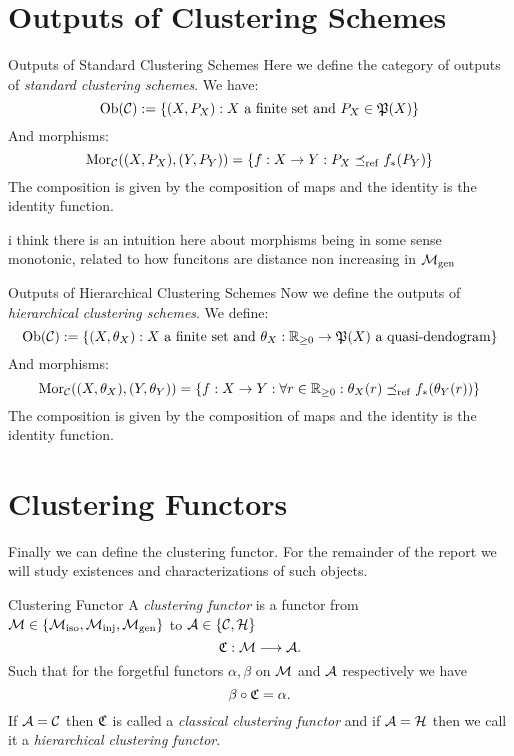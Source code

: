 \section{Outputs of Clustering Schemes}

\begin{definition}{Outputs of Standard Clustering Schemes}{}
Here we define the category of outputs of \emph{standard clustering schemes}. We have:
\begin{equation*}
    \mathrm {Ob}(\mathcal{C}) := \{(X, P_X): X \text{ a finite set and } P_X \in \mathfrak{P}(X)\}
\end{equation*}
And morphisms:
\begin{equation*}
    \mathrm {Mor}_{\mathcal{C}}((X, P_X), (Y,P_Y)) = \{f: X \to Y: P_X \preceq_\mathrm{ref} f_*(P_Y)\}
\end{equation*}
The composition is given by the composition of maps and the identity is the identity function.
\end{definition}

\todo i think there is an intuition here about morphisms being in some sense monotonic, related to how funcitons are distance non increasing in ${\mathcal{M}_\mathrm{gen}}$

\begin{definition}{Outputs of Hierarchical Clustering Schemes}{}
Now we define the outputs of \emph{hierarchical clustering schemes}. We define:
\begin{equation*}
    \mathrm {Ob}(\mathcal{C}) := \{(X, \theta_X): X \text{ a finite set and } \theta_X: \mathbb R_{\geq0} \to \mathfrak{P}(X) \text{ a quasi-dendogram}\}
\end{equation*}
And morphisms:
\begin{equation*}
    \mathrm {Mor}_{\mathcal{C}}((X, \theta_X), (Y,\theta_Y)) = \{f: X \to Y: \forall r \in \mathbb R_{\geq0}: \theta_X(r) \preceq_\mathrm{ref} f_*(\theta_Y(r)) \}
\end{equation*}
The composition is given by the composition of maps and the identity is the identity function.
\end{definition}

\section{Clustering Functors}
Finally we can define the clustering functor. For the remainder of the report we will study existences and characterizations of such objects.
\begin{definition}{Clustering Functor}{}
A \emph{clustering functor} is a functor from $\mathcal{M} \in \{{\mathcal{M}_\mathrm{iso}}, {\mathcal{M}_\mathrm{inj}}, {\mathcal{M}_\mathrm{gen}}\}$ to $\mathcal{A} \in \{\mathcal{C}, \mathcal{H}\}$
$$\mathfrak{C} : \mathcal{M} \longrightarrow \mathcal{A}.$$
Such that for the forgetful functors $\alpha, \beta$ on $\mathcal{M}$ and $\mathcal{A}$ respectively we have
\begin{equation*}
    \beta \circ \mathfrak{C} = \alpha.
\end{equation*}
If $\mathcal{A} = \mathcal{C}$ then $\mathfrak{C}$ is called a \emph{classical clustering functor} and if $\mathcal{A} = \mathcal{H}$ then we call it a \emph{hierarchical clustering functor}.
\end{definition}

